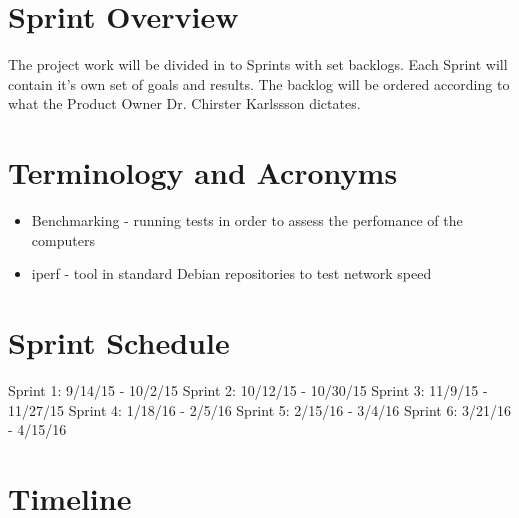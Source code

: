\section{Sprint  Overview}


The project work will be divided in to Sprints with set backlogs. Each Sprint will contain it's own set of goals and results. The backlog will be ordered according to what the Product Owner Dr. Chirster Karlssson dictates. 

\section{Terminology and Acronyms}
\begin{itemize}
	\item Benchmarking - running tests in order to assess the perfomance of the computers
	\item iperf - tool in standard Debian repositories to test network speed
\end{itemize}

\section{Sprint Schedule}

Sprint 1: 9/14/15 - 10/2/15
Sprint 2: 10/12/15 - 10/30/15
Sprint 3: 11/9/15 - 11/27/15
Sprint 4: 1/18/16 - 2/5/16
Sprint 5: 2/15/16 - 3/4/16
Sprint 6: 3/21/16 - 4/15/16

\section{Timeline}

